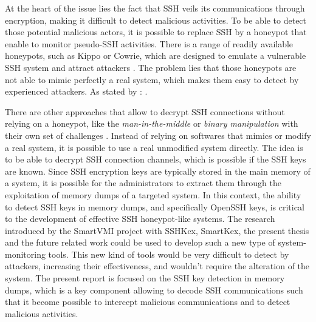 At the heart of the issue lies the fact that SSH veils its communications through encryption, making it difficult to detect malicious activities. To be able to detect those potential malicious actors, it is possible to replace SSH by a honeypot that enable to monitor pseudo-SSH activities. There is a range of readily available honeypots, such as Kippo or Cowrie, which are designed to emulate a vulnerable SSH system and attract attackers \cite{ClassificationMalware21}. The problem lies that those honeypots are not able to mimic perfectly a real system, which makes them easy to detect by experienced attackers. As stated by :  \cite{SSHHoneypotEffectiveness23}. 

There are other approaches that allow to decrypt SSH connections without relying on a honeypot, like the \textit{man-in-the-middle} or \textit{binary manipulation} with their own set of challenges \cite{SSHkex22}. Instead of relying on softwares that mimics or modify a real system, it is possible to use a real unmodified system directly. The idea is to be able to decrypt SSH connection channels, which is possible if the SSH keys are known. Since SSH encryption keys are typically stored in the main memory of a system, it is possible for the administrators to extract them through the exploitation of memory dumps of a targeted system. In this context, the ability to detect SSH keys in memory dumps, and specifically OpenSSH keys, is critical to the development of effective SSH honeypot-like systems. The research introduced by the SmartVMI project with SSHKex, SmartKex, the present thesis and the future related work could be used to develop such a new type of system-monitoring tools. This new kind of tools would be very difficult to detect by attackers, increasing their effectiveness, and wouldn't require the alteration of the system. The present report is focused on the SSH key detection in memory dumps, which is a key component allowing to decode SSH communications such that it become possible to intercept malicious communications and to detect malicious activities.

